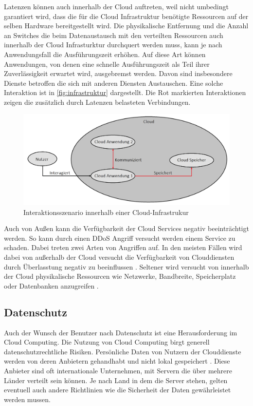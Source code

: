 Latenzen können auch innerhalb der Cloud auftreten, weil nicht umbedingt garantiert wird, dass die für die Cloud Infrastruktur benötigte Ressourcen auf der selben Hardware bereitgestellt wird. 
Die physikalische Entfernung und die Anzahl an Switches die beim Datenaustausch mit den verteilten Ressourcen auch innerhalb der Cloud Infrasturktur durchquert werden muss, kann je nach Anwendungsfall die Ausführungszeit erhöhen.
Auf diese Art können Anwendungen, von denen eine schnelle Ausführungszeit als Teil ihrer Zuverlässigkeit erwartet wird, ausgebremst werden. Davon sind insbesondere Dienste betroffen die sich mit anderen Diensten Austauschen. Eine solche Interaktion ist in \autoref{fig:infrastruktur} dargestellt. Die Rot markierten Interaktionen zeigen die zusätzlich durch Latenzen belasteten Verbindungen. 

\begin{figure}[b]
	\centering
	\includegraphics[width=\linewidth]{images/cloudstruktur.png}	
	\caption{Interaktionsszenario innerhalb einer Cloud-Infrastrukur}
	\label{fig:infrastruktur}
\end{figure}

Auch von Außen kann die Verfügbarkeit der Cloud Services negativ beeinträchtigt werden. So kann durch einen DDoS Angriff versucht werden einem Service zu schaden. Dabei treten zwei Arten von Angriffen auf. In den meisten Fällen wird dabei von außerhalb der Cloud versucht die Verfügbarkeit von Clouddiensten durch Überlasstung negativ zu beeinflussen \cite{darwish2013}. Seltener wird versucht von innerhalb der Cloud physikalische Ressourcen wie Netzwerke, Bandbreite, Speicherplatz oder Datenbanken anzugreifen \cite{darwish2013}.

\subsection{Datenschutz}
Auch der Wunsch der Benutzer nach Datenschutz ist eine Herausforderung im Cloud Computing. Die Nutzung von Cloud Computing birgt generell datenschutzrechtliche Risiken. 
Persönliche Daten von Nutzern der Clouddienste werden von deren Anbietern gehandhabt und nicht lokal gespeichert \cite{selzer2020}. 
Diese Anbieter sind oft internationale Unternehmen, mit Servern die über mehrere Länder verteilt sein können. Je nach Land in dem die Server stehen, gelten eventuell auch andere Richtlinien wie die Sicherheit der Daten gewährleistet werden mussen.

